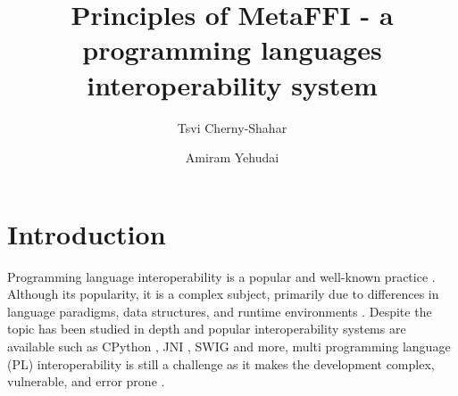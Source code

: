 \documentclass[sigplan,10pt,manuscript,nonacm]{acmart}
\begin{document}
\title{Principles of MetaFFI - a programming languages interoperability system}


\author{Tsvi Cherny-Shahar}
\author{Amiram Yehudai}



\begin{abstract}

\end{abstract}



\maketitle


\section{Introduction}


Programming language interoperability is a popular and well-known practice \cite{100k_opensource}\cite{issue_challenges_solutions}\cite{empirical_multi_lingual} \cite{xlang_survey}\cite{demystifying_issues}. 
Although its popularity, it is a complex subject, primarily due to differences in language paradigms, data structures, and runtime environments\cite{challenges_of_interop}\cite{polispin} \cite{toward_description_of_interop} \cite{multilingual_systems_constructed} \cite{lang_interaction} \cite{empirical_multi_lingual}. 
Despite the topic has been studied in depth and popular interoperability systems are available such as CPython \cite{cpython}, JNI \cite{jni}, SWIG \cite{swig} and more, multi programming language (PL) interoperability is still a challenge as it makes the development complex, vulnerable, and error prone \cite{demystifying_issues} \cite{vulnerability_proneness_multilingual} \cite{multilingual_systems_constructed} \cite{multi_language_fault_prone} \cite{impact_of_interlanguage_dependencies}.
\end{document}
